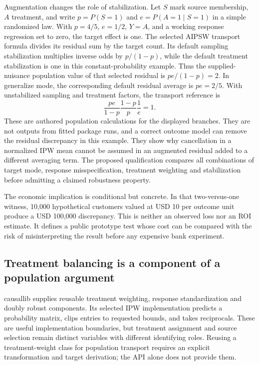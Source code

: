 Augmentation changes the role of stabilization. Let $S$ mark source membership, $A$ treatment, and write $p=P(S=1)$ and $e=P(A=1\mid S=1)$ in a simple randomized law. With $p=4/5$, $e=1/2$, $Y=A$, and a working response regression set to zero, the target effect is one. The selected AIPSW transport formula divides its residual sum by the target count. Its default sampling stabilization multiplies inverse odds by $p/(1-p)$, while the default treatment stabilization is one in this constant-probability example. Thus the supplied-nuisance population value of that selected residual is $pe/(1-p)=2$. In generalize mode, the corresponding default residual average is $pe=2/5$. With unstabilized sampling and treatment factors, the transport reference is
\[
 \frac{pe}{1-p}\frac{1-p}{p}\frac1e=1.
\]
These are authored population calculations for the displayed branches. They are not outputs from fitted package runs, and a correct outcome model can remove the residual discrepancy in this example. They show why cancellation in a normalized IPW mean cannot be assumed in an augmented residual added to a different averaging term. The proposed qualification compares all combinations of target mode, response misspecification, treatment weighting and stabilization before admitting a claimed robustness property.~\citep{exec25_ptm_zepid,exec25_ptm_choice}

The economic implication is conditional but concrete. In that two-versus-one witness, 10,000 hypothetical customers valued at USD 10 per outcome unit produce a USD 100,000 discrepancy. This is neither an observed loss nor an ROI estimate. It defines a public prototype test whose cost can be compared with the risk of misinterpreting the result before any expensive bank experiment.~\citep{exec25_ptm_choice}

\subsection{Treatment balancing is a component of a population argument}

causallib supplies reusable treatment weighting, response standardization and doubly robust components. Its selected IPW implementation predicts a probability matrix, clips entries to requested bounds, and takes reciprocals. These are useful implementation boundaries, but treatment assignment and source selection remain distinct variables with different identifying roles. Reusing a treatment-weight class for population transport requires an explicit transformation and target derivation; the API alone does not provide them.~\citep{exec25_ptm_causallib}

